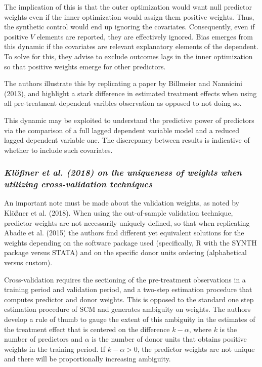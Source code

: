 \documentclass[12pt,a4paper,draft]{article}
\begin{document}
The implication of this is that the outer optimization would want null predictor weights 
even if the inner optimization would assign them positive weights. Thus, the synthetic 
control would end up ignoring the covariates. Consequently, even if positive $V$ elements 
are reported, they are effectively ignored. Bias emerges from this dynamic if the 
covariates are relevant explanatory elements of the dependent. To solve for this, they 
advise to exclude outcomes lags in the inner optimization so that positive weights 
emerge for other predictors.

The authors illustrate this by replicating a paper by Billmeier and Nannicini (2013), 
and highlight a stark difference in estimated treatment effects when using all 
pre-treatment dependent varibles observation as opposed to not doing so. 

This dynamic may be exploited to understand the predictive power of predictors via the 
comparison of a full lagged dependent variable model and a reduced lagged dependent 
variable one. The discrepancy between results is indicative of whether to include 
such covariates.

\subsubsection*{\textit{Klößner et al. (2018) on the uniqueness of weights 
when utilizing cross-validation techniques}}
An important note must be made about the validation weights, as noted by 
Klößner et al. (2018). When using the out-of-sample validation technique, 
predictor weights are not necessarily uniquely defined, so that when replicating 
Abadie et al. (2015) the authors find different yet equivalent solutions 
for the weights depending on the software package used (specifically, R with 
the SYNTH package versus STATA) and on the specific donor units ordering (alphabetical 
versus custom).

Cross-validation requires the sectioning of the pre-treatment observations 
in a training period and validation period, and a two-step estimation procedure 
that computes predictor and donor weights. This is opposed to the standard 
one step estimation procedure of SCM and generates ambiguity on weights. 
The authors develop a rule of thumb to gauge the extent of this ambiguity 
in the estimates of the treatment effect that is centered on the difference 
$k-\alpha$, where $k$ is the number of predictors and $\alpha$ is the number of 
donor units that obtains positive weights in the training period.
If $k-\alpha>0$, the predictor weights are not unique and there will be 
proportionally increasing ambiguity.
\end{document}
